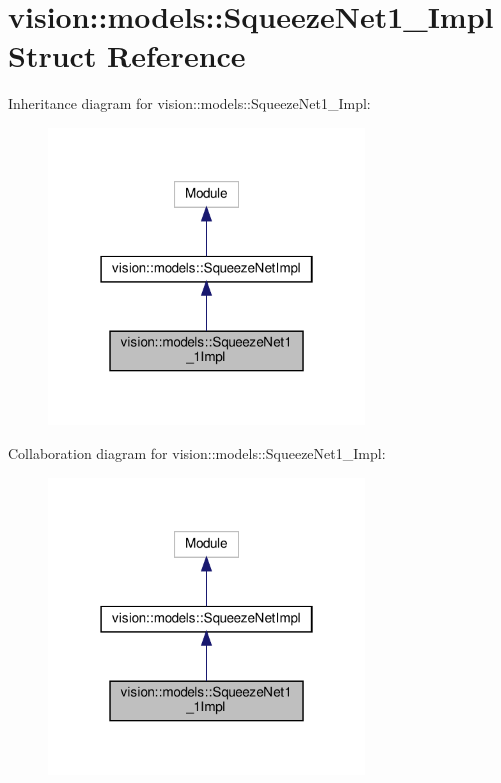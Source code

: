 \hypertarget{structvision_1_1models_1_1SqueezeNet1__1Impl}{}\section{vision\+:\+:models\+:\+:Squeeze\+Net1\+\_\+Impl Struct Reference}
\label{structvision_1_1models_1_1SqueezeNet1__1Impl}


Inheritance diagram for vision\+:\+:models\+:\+:Squeeze\+Net1\+\_\+Impl\+:
\nopagebreak
\begin{figure}[H]
\begin{center}
\leavevmode
\includegraphics[width=238pt]{structvision_1_1models_1_1SqueezeNet1__1Impl__inherit__graph}
\end{center}
\end{figure}


Collaboration diagram for vision\+:\+:models\+:\+:Squeeze\+Net1\+\_\+Impl\+:
\nopagebreak
\begin{figure}[H]
\begin{center}
\leavevmode
\includegraphics[width=238pt]{structvision_1_1models_1_1SqueezeNet1__1Impl__coll__graph}
\end{center}
\end{figure}
